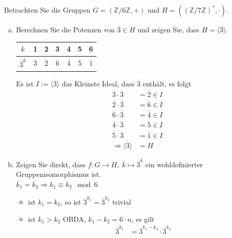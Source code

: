 \documentclass{article}
\newcommand{\Z}{\mathbb{Z}}
\begin{document}
\subsection{}
\color{blue}
Betrachten Sie die Gruppen $G = (\Z/6\Z,+)$ und $H = ((\Z/7\Z)^*,\cdot)$.
\color{black}
\begin{enumerate}[(a)]
    \item
        \color{blue}
        Berechnen Sie die Potenzen von $\overline{3} \in H$ und zeigen Sie, dass
        $H = \langle\overline{3}\rangle$.\\
        \color{black}
        \begin{tabular}{c|cccccc}
            $k$&1&2&3&4&5&6\\\hline
            $\overline{3}^{\overline{k}}$&
            $\overline{3}$&$\overline{2}$&$\overline{6}$&$\overline{4}$&$\overline{5}$&$\overline{1}$
        \end{tabular}
        Es ist $I:=\langle\overline{3}\rangle$ das Kleinste Ideal, dass $\overline{3}$ enthält,
        es folgt
        \begin{align*}
            \overline{3}\cdot\overline{3}&=\overline{2}\in I\\
            \overline{2}\cdot\overline{3}&=\overline{6}\in I\\
            \overline{6}\cdot\overline{3}&=\overline{4}\in I\\
            \overline{4}\cdot\overline{3}&=\overline{5}\in I\\
            \overline{5}\cdot\overline{3}&=\overline{1}\in I\\
            \Rightarrow\langle\overline{3}\rangle&=H
        \end{align*}
    \item
        \color{blue}
        Zeigen Sie direkt, dass $f\colon G \longrightarrow H,\;
        \overline{k}\longmapsto \overline{3}^k$ ein wohldefinierter Gruppenisomorphismus ist.\\
        \color{black}
        $\overline{k_1}=\overline{k_2}\Rightarrow k_1\equiv k_2\mod 6$
        \begin{itemize}
            \item ist $k_1=k_2$, so ist $\overline{3}^{k_1}=\overline{3}^{k_2}$ trivial
            \item ist $k_1>k_2$ OBDA, $k_1-k_2=6\cdot n$, es gilt
                \begin{align*}
                    \overline{3}^{k_1}
                    &=\overline{3}^{k_1-k_2}\cdot\overline{3}^{k_2}\\

\end{align*}
\end{itemize}
\end{enumerate}
\end{document}
